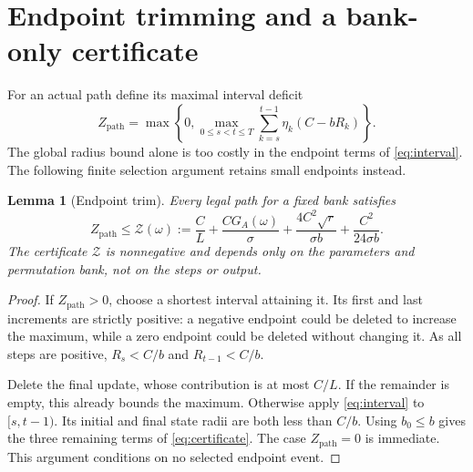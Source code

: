 \documentclass[11pt]{article}
\newtheorem{lemma}[theorem]{Lemma}
\theoremstyle{remark}
\begin{document}
\section{Endpoint trimming and a bank-only certificate}

For an actual path define its maximal interval deficit
\begin{equation}\label{eq:path-deficit}
 Z_{\mathrm{path}}=\max\!\left\{0,
       \max_{0\le s<t\le T}\sum_{k=s}^{t-1}\eta_k(C-bR_k)\right\}.
\end{equation}
The global radius bound alone is too costly in the endpoint terms of
\eqref{eq:interval}. The following finite selection argument retains
small endpoints instead.

\begin{lemma}[Endpoint trim]\label{lem:trim}
Every legal path for a fixed bank satisfies
\begin{equation}\label{eq:certificate}
 Z_{\mathrm{path}}\le\mathcal Z(\omega):=
 \frac CL+\frac{C G_A(\omega)}{\sigma}
       +\frac{4C^2\sqrt r}{\sigma b}+\frac{C^2}{24\sigma b}.
\end{equation}
The certificate $\mathcal Z$ is nonnegative and depends only on the
parameters and permutation bank, not on the steps or output.
\end{lemma}
\begin{proof}
If $Z_{\mathrm{path}}>0$, choose a shortest interval attaining it.
Its first and last increments are strictly positive: a negative
endpoint could be deleted to increase the maximum, while a zero
endpoint could be deleted without changing it. As all steps are
positive, $R_s<C/b$ and $R_{t-1}<C/b$.

Delete the final update, whose contribution is at most $C/L$. If the
remainder is empty, this already bounds the maximum. Otherwise apply
\eqref{eq:interval} to $[s,t-1)$. Its initial and final state radii
are both less than $C/b$. Using $b_0\le b$ gives the three remaining
terms of \eqref{eq:certificate}. The case $Z_{\mathrm{path}}=0$ is
immediate. This argument conditions on no selected endpoint event.
\end{proof}
\end{document}
